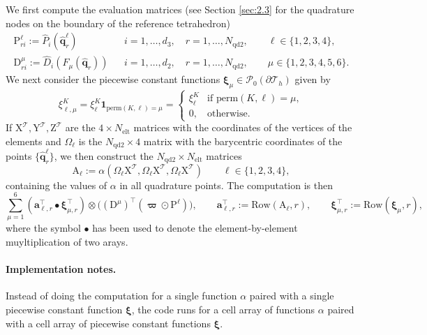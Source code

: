 \documentclass[10pt,english]{article}
\newcommand{\Nelt}{{N_{\mathrm{elt}}}}
\newcommand{\Nndb}{{N_{\mathrm{qd2}}}}
\newcommand{\qq}{\widehat{\mathbf q}}
\begin{document}
We first compute the evaluation matrices (see Section \ref{sec:2.3} for the quadrature nodes on the boundary of the reference tetrahedron)
\begin{eqnarray*}
\mathrm P^\ell_{ri}:=\widehat P_i(\qq_r^\ell) & & i=1,\ldots,d_3, \quad r=1,\ldots,\Nndb, \qquad \ell\in \{1,2,3,4\},\\
\mathrm D_{ri}^\mu:=\widehat D_i(F_\mu(\qq_r)) & & i=1,\ldots,d_2, \quad r=1,\ldots,\Nndb, \qquad \mu\in \{1,2,3,4,5,6\}.
\end{eqnarray*}
We next consider the piecewise constant functions 
 $\boldsymbol\xi_\mu\in \mathcal P_0(\partial\mathcal T_h)$ given by
\[
\xi_{\ell,\mu}^K= \xi_\ell^K \mathbf 1_{\mathrm{perm}(K,\ell)=\mu} =\left\{ \begin{array}{ll}\xi_\ell^K & \mbox{if $\mathrm{perm}(K,\ell)=\mu$},\\0, & \mbox{otherwise}.\end{array}\right.
\]
If $\mathrm X^{\mathcal T},\mathrm Y^{\mathcal T},\mathrm Z^{\mathcal T}$ are the $4\times \Nelt$ matrices with the coordinates of the vertices of the elements and $\Omega_\ell$ is the $\Nndb\times 4$ matrix with the barycentric coordinates of the points $\{\qq_r^\ell\}$, we then construct the $\Nndb\times \Nelt$ matrices
\[
\mathrm A_\ell:=\alpha(\Omega_\ell\mathrm X^{\mathcal T},\Omega_\ell\mathrm X^{\mathcal T},\Omega_\ell\mathrm X^{\mathcal T})\qquad \ell\in \{1,2,3,4\},
\]
containing the values of $\alpha$ in all quadrature points. The computation is then
\[
\sum_{\mu=1}^6 (\mathbf a_{\ell,r}^\top \bullet \boldsymbol\xi_{\mu,r}^\top)\otimes \Big( (\mathrm D^\mu)^\top (\boldsymbol\varpi\odot\mathrm P^\ell)\Big), \qquad \mathbf a_{\ell,r}^\top :=\mathrm{Row}(\mathrm A_\ell,r), \qquad \boldsymbol\xi_{\mu,r}^\top:=\mathrm{Row}(\boldsymbol\xi_\mu,r),
\]
where the symbol $\bullet$ has been used to denote the element-by-element muyltiplication of two arays.

\paragraph{Implementation notes.} Instead of doing the computation for a single function $\alpha$ paired with a single piecewise constant function $\boldsymbol\xi$, the code runs for a cell array of functions $\alpha$ paired with a cell array of piecewise constant functions $\boldsymbol\xi$.



\end{document}
